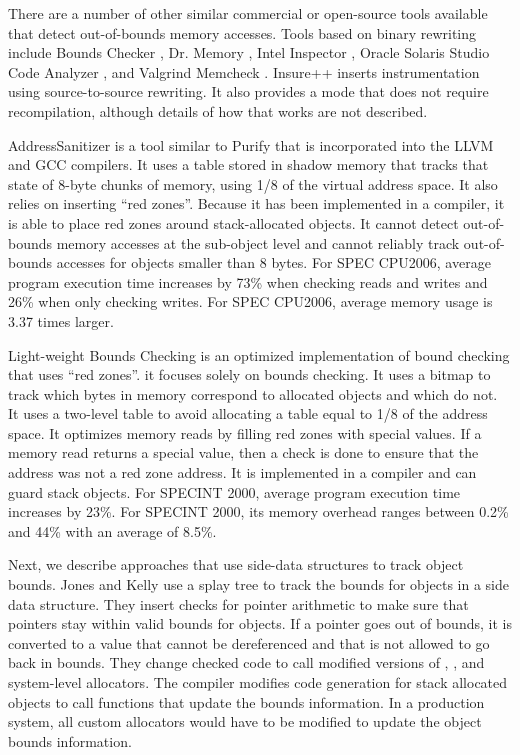 There are a number of other similar commercial or open-source tools available
that detect out-of-bounds memory accesses.
Tools based on binary rewriting include Bounds Checker \cite{BoundsChecker2016}, 
Dr. Memory \cite{Bruening2011,DrMemory2016}, Intel Inspector \cite{Intel2016},
Oracle Solaris Studio Code Analyzer \cite{CodeAnalyzer2016},
and Valgrind Memcheck  \cite{Nethercote2007, Valgrind2016}.  Insure++ 
\cite{Insure2016}
inserts instrumentation using source-to-source rewriting.  It also provides
a mode that does not require recompilation, although details of how that
works are not described.

AddressSanitizer \cite{Serebryany2012} is a tool similar to Purify that is
incorporated into the LLVM and GCC compilers.  It uses a table
stored in shadow memory that tracks that state of 8-byte chunks of memory, using
1/8 of the virtual address space.  It also relies on inserting ``red zones''.
Because it has been implemented in a compiler, it is able to place red zones
around stack-allocated objects.   It cannot detect out-of-bounds memory
accesses at the sub-object level and cannot reliably track out-of-bounds accesses
for objects smaller than 8 bytes.  For SPEC CPU2006, average program execution time
increases by 73\% when checking reads and writes and 26\%
when only checking writes. For SPEC CPU2006, average memory usage is 
3.37 times larger.

Light-weight Bounds Checking \cite{Hasabnis2012} is an optimized implementation of bound
checking that uses ``red zones''.
it focuses solely on bounds checking.  It uses a bitmap to track
which bytes in memory correspond to allocated objects and which do not.
It uses a two-level table to avoid allocating a table equal to 1/8 of the
address space.  It optimizes memory reads by filling red zones with special
values.  If a memory read returns a special value, then a check is done to
ensure that the address was not a red zone address.  It is implemented in a compiler and can guard stack objects.  For SPECINT 2000, average 
program execution time increases by 23\%. For SPECINT 2000, its memory 
overhead ranges between 0.2\% and 44\% with an average of 8.5\%.

Next, we describe approaches that use side-data structures to track
object bounds.   
Jones and Kelly \cite{Jones1997} use a splay tree to track the bounds for
objects in a side data structure.  They insert 
checks for pointer arithmetic to make sure that pointers stay within valid bounds for
objects.  If a pointer goes out of bounds, it is converted to a value that cannot
be dereferenced and that is not allowed to go back in bounds. 
They change checked code to call modified versions of ,
, and system-level allocators.  The compiler modifies
code generation for stack allocated objects to call functions that update the 
bounds information. In a production system, all custom allocators would have to be
modified to update the object bounds information.  

